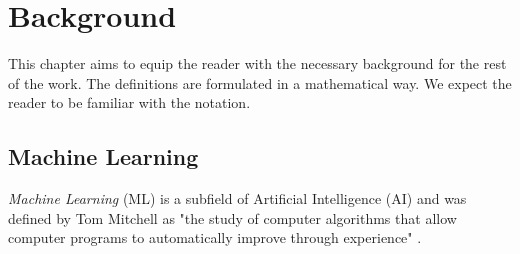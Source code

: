 
\chapter{Background}
\label{ch:background}

This chapter aims to equip the reader with the necessary background for the rest of the work. The definitions are formulated in a mathematical way. We expect the reader to be familiar with the notation.

\section{Machine Learning}
\label{sec:machinelearning}

\textit{Machine Learning} (ML) is a subfield of Artificial Intelligence (AI) and was defined by Tom Mitchell as "the study of computer algorithms that allow computer programs to automatically improve through experience" \cite{mitchell_machine_1997}.

